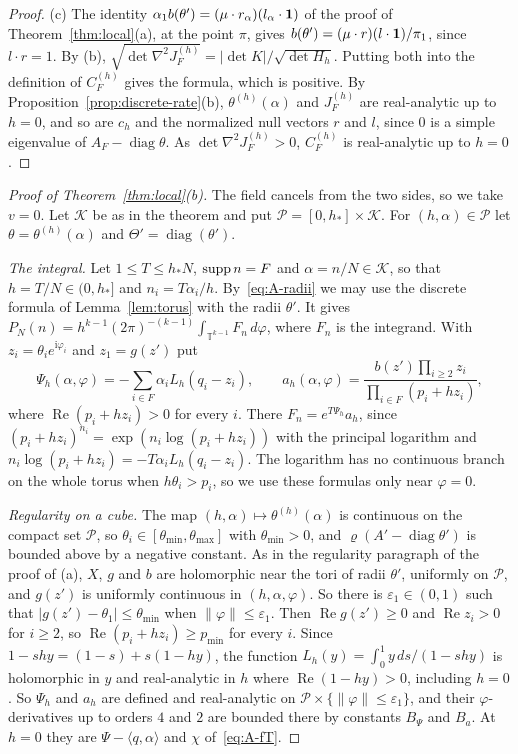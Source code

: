 \begin{proof}
(c) The identity $\alpha_1b(\theta')=(\mu\cdot r_\alpha)(l_\alpha\cdot\mathbf{1})$ of the
proof of Theorem~\ref{thm:local}(a), at the point $\pi$, gives
$b(\theta')=(\mu\cdot r)(l\cdot\mathbf{1})/\pi_1$, since $l\cdot r=1$. By (b),
$\sqrt{\det\nabla^2J^{(h)}_F}=|\det K|/\sqrt{\det H_h}$. Putting both into the
definition of $C^{(h)}_F$ gives the formula, which is positive. By
Proposition~\ref{prop:discrete-rate}(b), $\theta^{(h)}(\alpha)$ and $J^{(h)}_F$ are
real-analytic up to $h=0$, and so are $c_h$ and the normalized null vectors $r$ and $l$,
since $0$ is a simple eigenvalue of $A_F-\operatorname{diag}\theta$. As
$\det\nabla^2J^{(h)}_F>0$, $C^{(h)}_F$ is real-analytic up to $h=0$.
\end{proof}

\begin{proof}[Proof of Theorem~\ref{thm:local}(b)]
The field cancels from the two sides, so we take $v=0$. Let $\mathcal K$ be as in the
theorem and put $\mathcal P=[0,h_*]\times\mathcal K$. For $(h,\alpha)\in\mathcal P$ let
$\theta=\theta^{(h)}(\alpha)$ and $\Theta'=\operatorname{diag}(\theta')$.

\emph{The integral.} Let $1\le T\le h_*N$, $\operatorname{supp} n=F$ and $\alpha=n/N\in\mathcal K$, so
that $h=T/N\in(0,h_*]$ and $n_i=T\alpha_i/h$. By~\eqref{eq:A-radii} we may use the
discrete formula of Lemma~\ref{lem:torus} with the radii $\theta'$. It gives
$P_N(n)=h^{k-1}(2\pi)^{-(k-1)}\int_{\mathbb T^{k-1}}F_n\,d\varphi$, where $F_n$ is the
integrand. With $z_i=\theta_ie^{\mathrm i\varphi_i}$ and $z_1=g(z')$ put
\[
\Psi_h(\alpha,\varphi)=-\sum_{i\in F}\alpha_iL_h(q_i-z_i),\qquad
a_h(\alpha,\varphi)=\frac{b(z')\prod_{i\ge2}z_i}{\prod_{i\in F}(p_i+hz_i)},
\]
where $\operatorname{Re}(p_i+hz_i)>0$ for every $i$. There $F_n=e^{T\Psi_h}a_h$, since
$(p_i+hz_i)^{n_i}=\exp(n_i\log(p_i+hz_i))$ with the principal logarithm and
$n_i\log(p_i+hz_i)=-T\alpha_iL_h(q_i-z_i)$. The logarithm has no continuous branch on the whole
torus when $h\theta_i>p_i$, so we use these formulas only near $\varphi=0$.

\emph{Regularity on a cube.} The map $(h,\alpha)\mapsto\theta^{(h)}(\alpha)$ is
continuous on the compact set $\mathcal P$, so $\theta_i\in[\theta_{\min},\theta_{\max}]$
with $\theta_{\min}>0$, and $\varrho(A'-\operatorname{diag}\theta')$ is bounded above by
a negative constant. As in the regularity paragraph of the proof of (a), $X$, $g$ and
$b$ are holomorphic near the tori of radii $\theta'$, uniformly on $\mathcal P$, and
$g(z')$ is uniformly continuous in $(h,\alpha,\varphi)$. So there is
$\varepsilon_1\in(0,1)$ such that $|g(z')-\theta_1|\le\theta_{\min}$ when
$\lVert\varphi\rVert\le\varepsilon_1$. Then $\operatorname{Re}g(z')\ge0$ and
$\operatorname{Re}z_i>0$ for $i\ge2$, so $\operatorname{Re}(p_i+hz_i)\ge p_{\min}$ for
every $i$. Since $1-shy=(1-s)+s(1-hy)$, the function $L_h(y)=\int_0^1y\,ds/(1-shy)$ is
holomorphic in $y$ and real-analytic in $h$ where $\operatorname{Re}(1-hy)>0$, including
$h=0$. So $\Psi_h$ and $a_h$ are defined and real-analytic on
$\mathcal P\times\{\lVert\varphi\rVert\le\varepsilon_1\}$, and their
$\varphi$-derivatives up to orders $4$ and $2$ are bounded there by constants $B_\Psi$
and $B_a$. At $h=0$ they are $\Psi-\langle q,\alpha\rangle$ and $\chi$
of~\eqref{eq:A-fT}.


\end{proof}
